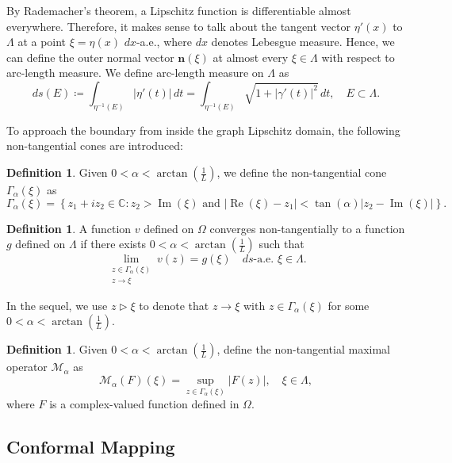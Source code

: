 \documentclass[12pt]{amsart}
\theoremstyle{plain}
\theoremstyle{definition}
\newtheorem{definition}[theorem]{Definition}
\numberwithin{equation}{section}
\begin{document}
By Rademacher's theorem, a Lipschitz function is differentiable almost everywhere. Therefore, it makes sense to talk about the tangent vector $\eta'(x)$ to $\Lambda$ at a point $\xi=\eta(x)$ $dx$-a.e., where $dx$ denotes Lebesgue measure. Hence, we can define the outer normal vector $\mathbf{n}(\xi)$ at almost every $\xi\in \Lambda$ with respect to arc-length measure. We define arc-length measure on $\Lambda$ as
\[
ds(E)
\coloneqq 
\int_{\eta^{-1}(E)}|\eta'(t)|\, dt
=
\int_{\eta^{-1}(E)}\sqrt{1+|\gamma'(t)|^2}\, dt,\quad E\subset\Lambda.
\]

To approach the boundary from inside the graph Lipschitz domain, the following non-tangential cones are introduced:

\begin{definition}
Given $0<\alpha<\arctan (\frac{1}{L})$, we define the non-tangential cone $\Gamma_{\alpha}(\xi)$ as
\[
\Gamma_\alpha(\xi)=\left\{z_1+i z_2 \in \mathbb{C}: z_2>\operatorname{Im}(\xi) \text { and }\left|\operatorname{Re}(\xi)-z_1\right|<\tan (\alpha)\left|z_2-\operatorname{Im}(\xi)\right|\right\}.
\]     
\end{definition}

\begin{definition}
A function $v$ defined on $\Omega$ converges non-tangentially to a function $g$ defined on $\Lambda$ if there exists $0<\alpha<\arctan(\frac{1}{L})$ such that 
\[
\lim _{\substack{z \in \Gamma_\alpha(\xi)\\ z \rightarrow \xi}} v(z)
=
g(\xi)
\quad ds\text{-a.e. } \xi \in \Lambda.
\]    
\end{definition}


In the sequel, we use $z \triangleright \xi$ to denote that $z \rightarrow \xi$ with $z \in \Gamma_\alpha(\xi)$ for some $0<\alpha<\arctan (\frac{1}{L})$.



\begin{definition}
Given $0<\alpha<\arctan (\frac{1}{L})$, define the non-tangential maximal operator $\mathcal{M}_\alpha$ as
\[
\mathcal{M}_\alpha(F)(\xi)=\sup _{z \in \Gamma_\alpha(\xi)}|F(z)|, \quad \xi \in \Lambda,
\]
where $F$ is a complex-valued function defined in $\Omega$.
\end{definition}





\subsection{Conformal Mapping}
\end{document}
